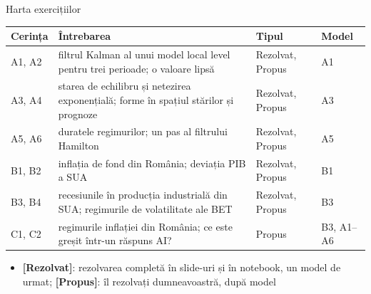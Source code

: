 \begin{frame}{Harta exercițiilor}
\itemsize{\small}
\begin{center}
\footnotesize
\begin{tabular}{>{\raggedright\arraybackslash}p{1.1cm}>{\raggedright\arraybackslash}p{7.5cm}>{\raggedright\arraybackslash}p{1.9cm}>{\raggedright\arraybackslash}p{1.4cm}}
\toprule
\textbf{Cerința} & \textbf{Întrebarea} & \textbf{Tipul} & \textbf{Model} \\
\midrule
A1, A2 & filtrul Kalman al unui model local level pentru trei perioade; o valoare lipsă & Rezolvat, Propus & A1 \\
A3, A4 & starea de echilibru și netezirea exponențială; forme în spațiul stărilor și prognoze & Rezolvat, Propus & A3 \\
A5, A6 & duratele regimurilor; un pas al filtrului Hamilton & Rezolvat, Propus & A5 \\
B1, B2 & inflația de fond din România; deviația PIB a SUA & Rezolvat, Propus & B1 \\
B3, B4 & recesiunile în producția industrială din SUA; regimurile de volatilitate ale BET & Rezolvat, Propus & B3 \\
C1, C2 & regimurile inflației din România; ce este greșit într-un răspuns AI? & Propus & B3, A1--A6 \\
\bottomrule
\end{tabular}
\end{center}
\begin{itemize}
    \item \textbf{[Rezolvat]}: rezolvarea completă în slide-uri și în notebook, un model de urmat; \textbf{[Propus]}: îl rezolvați dumneavoastră, după model
\end{itemize}
\end{frame}

